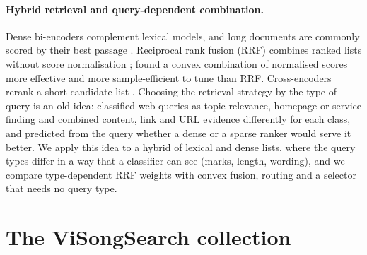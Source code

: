 \documentclass[11pt]{article}
\begin{document}
\paragraph{Hybrid retrieval and query-dependent combination.}
Dense bi-encoders \citep{karpukhin2020dpr,reimers2019sbert} complement lexical models, and long documents are
commonly scored by their best passage \citep{dai2019maxp}. Reciprocal rank fusion (RRF) combines ranked lists
without score normalisation \citep{cormack2009rrf}; \citet{bruch2023fusion} found a convex combination of
normalised scores more effective and more sample-efficient to tune than RRF. Cross-encoders rerank a short
candidate list \citep{nogueira2019monobert}. Choosing the retrieval strategy by the type of query is an old
idea: \citet{kang2003querytype} classified web queries as topic relevance, homepage or service finding and
combined content, link and URL evidence differently for each class, and \citet{arabzadeh2021dense} predicted
from the query whether a dense or a sparse ranker would serve it better. We apply this idea to a hybrid of
lexical and dense lists, where the query types differ in a way that a classifier can see (marks, length,
wording), and we compare type-dependent RRF weights with convex fusion, routing and a selector that needs no
query type.

\section{The ViSongSearch collection}\label{sec:collection}
\end{document}
